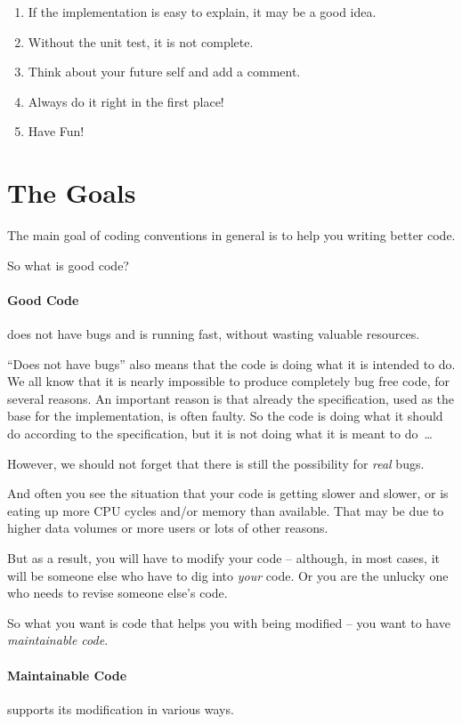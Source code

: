 \documentclass[11pt,a4paper, titlepage, parskip=half, headsepline, footsepline, cleardoublepage=current, headheight=1cm]{scrbook}
\begin{document}
\begin{enumerate}[nosep]
	\item{If the implementation is easy to explain, it may be a good idea.}\label{lst:ZoP:GoodIdea}
	\item{Without the unit test, it is not complete.}\label{lst:ZoP:NotCompleteWithoutTest}
	\item{Think about your future self and add a comment.}\label{lst:ZoP:FutureSelf}
	\item{Always do it right in the first place!}\label{lst:ZoP:BasicRule}
	\item{Have Fun!}\label{lst:ZoP:HaveFun}
\end{enumerate}

\section{The Goals}
The main goal of coding conventions in general is to help you writing better code.

So what is good code?

\paragraph{Good Code} does not have bugs and is running fast, without wasting valuable resources.

“Does not have bugs” also means that the code is doing what it is intended to do. We all know that it is nearly impossible to produce completely bug free code, for several reasons. An important reason is that already the specification, used as the base for the implementation, is often faulty. So the code is doing what it should do according to the specification, but it is not doing what it is meant to do~…

However, we should not forget that there is still the possibility for \textit{real} bugs.

And often you see the situation that your code is getting slower and slower, or is eating up more CPU cycles and/or memory than available. That may be due to higher data volumes or more users or lots of other reasons.

But as a result, you will have to modify your code – although, in most cases, it will be someone else who have to dig into \textit{your} code.  Or you are the unlucky one who needs to revise someone else's code.

So what you want is code that helps you with being modified – you want to have \textit{maintainable code}.

\paragraph{Maintainable Code} supports its modification in various ways.
\end{document}
